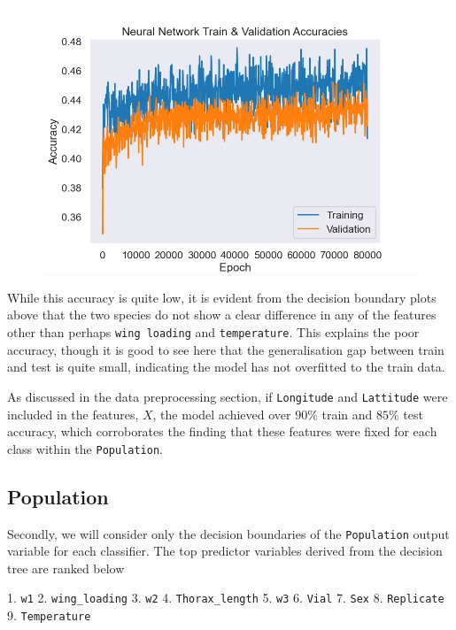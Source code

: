 \documentclass{article}
\begin{document}
\begin{figure}
    \centering
    \includegraphics{plots/nn_train_val_accuracies.png}
    \caption{}
    \label{fig:}
\end{figure}

While this accuracy is quite low, it is evident from the decision boundary plots above that the two species do not show a clear difference in any of the features other than perhaps \texttt{wing loading} and \texttt{temperature}. This explains the poor accuracy, though it is good to see here that the generalisation gap between train and test is quite small, indicating the model has not overfitted to the train data.

As discussed in the data preprocessing section, if \texttt{Longitude} and \texttt{Lattitude} were included in the features, $X$, the model achieved over $90\%$ train and $85\%$ test accuracy, which corroborates the finding that these features were fixed for each class within the \texttt{Population}.


\subsection{Population}

Secondly, we will consider only the decision boundaries of the \texttt{Population} output variable for each classifier. The top predictor variables derived from the decision tree are ranked below

1. \texttt{w1}
2. \texttt{wing_loading}
3. \texttt{w2}
4. \texttt{Thorax_length}
5. \texttt{w3}
6. \texttt{Vial}
7. \texttt{Sex}
8. \texttt{Replicate}
9. \texttt{Temperature}
\end{document}
